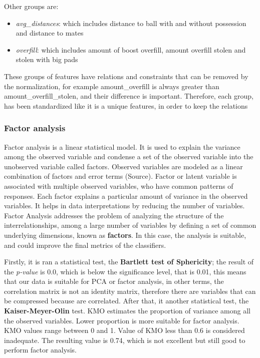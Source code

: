 Other groups are:
\begin{itemize}
    \item \textit{avg\_distances}: which includes distance to ball with and without possession and distance to mates
    \item \textit{overfill}: which includes amount of boost overfill, amount overfill stolen and stolen with big pads
\end{itemize}

These groups of features have relations and constraints that can be removed by the normalization, for example amount\_overfill is always greater than amount\_overfill\_stolen, and their difference is important. Therefore, each group, has been standardized like it is a unique features, in order to keep the relations


\subsubsection{Factor analysis}

Factor analysis is a linear statistical model. It is used to explain the variance among the observed variable and condense a set of the observed variable into the unobserved variable called factors. Observed variables are modeled as a linear combination of factors and error terms (Source). Factor or latent variable is associated with multiple observed variables, who have common patterns of responses. Each factor explains a particular amount of variance in the observed variables. It helps in data interpretations by reducing the number of variables.
Factor Analysis addresses the problem of analyzing the structure of the interrelationships, among a large number of variables by defining a set of common underlying dimensions, known as \textbf{factors}. In this case, the analysis is suitable, and could improve the final metrics of the classifiers.

Firstly, it is ran a statistical test, the \textbf{Bartlett test of Sphericity}; the result of the \textit{p-value} is 0.0, which is below the significance level, that is 0.01, this means that our data is suitable for PCA or factor analysis, in other terms, the correlation matrix is not an identity matrix, therefore there are variables that can be compressed because are correlated.
After that, it another statistical test, the \textbf{Kaiser-Meyer-Olin} test. KMO estimates the proportion of variance among all the observed variables. Lower proportion is more suitable for factor analysis. KMO values range between 0 and 1. Value of KMO less than 0.6 is considered inadequate. The resulting value is 0.74, which is not excellent but still good to perform factor analysis.

